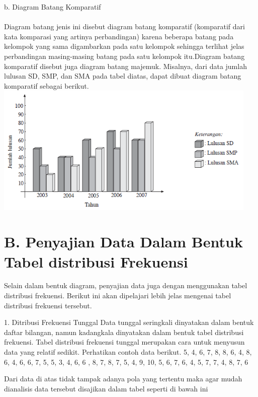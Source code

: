 \documentclass[11pt,fleqn]{book} %
\begin{document}
{			b.	Diagram Batang Komparatif\\\\	
		Diagram batang jenis ini disebut diagram batang komparatif (komparatif dari kata komparasi yang artinya perbandingan) karena beberapa batang pada kelompok yang sama digambarkan pada satu kelompok sehingga terlihat jelas perbandingan masing-masing batang pada satu kelompok itu.Diagram batang komparatif disebut juga diagram batang majemuk. Misalnya, dari data jumlah lulusan SD, SMP, dan SMA pada tabel diatas, dapat dibuat diagram batang komparatif sebagai berikut.\\
	
\includegraphics[width = 12.6cm, height= 6.25cm]{Pictures/Gb19_diana.png}\\




\section{B. Penyajian Data Dalam Bentuk Tabel distribusi Frekuensi}

Selain dalam bentuk diagram, penyajian data juga dengan menggunakan tabel distribusi
frekuensi. Berikut ini akan dipelajari lebih jelas mengenai tabel distribusi frekuensi tersebut.


1. Ditribusi Frekuensi Tunggal
Data tunggal seringkali dinyatakan dalam bentuk daftar bilangan, namun kadangkala
dinyatakan dalam bentuk tabel distribusi frekuensi. Tabel distribusi frekuensi tunggal
merupakan cara untuk menyusun data yang relatif sedikit. Perhatikan contoh data berikut.
5, 4, 6, 7, 8, 8, 6, 4, 8, 6, 4, 6, 6, 7, 5, 5, 3, 4, 6, 6 , 8, 7, 8, 7, 5, 4, 9, 10, 5, 6, 7, 6, 4, 5, 7, 7, 4, 8, 7, 6

Dari data di atas tidak tampak adanya pola yang tertentu maka agar mudah dianalisis
data tersebut disajikan dalam tabel seperti di bawah ini

}
\end{document}
